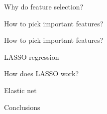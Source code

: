 \begin{frame}[t]{Why do feature selection?}

\end{frame}
\begin{frame}[t]{How to pick important features?}

\end{frame}
\begin{frame}[t]{How to pick important features?}

\end{frame}
\begin{frame}[t]{LASSO regression}

\end{frame}
\begin{frame}[t]{How does LASSO work?}

\end{frame}
\begin{frame}[t]{Elastic net}

\end{frame}
\begin{frame}[t]{Conclusions}

\end{frame}
